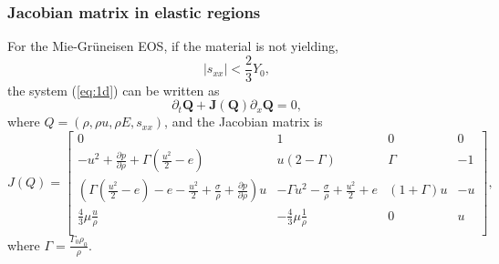 \documentclass[review]{elsarticle}
\begin{document}
\subsubsection{Jacobian matrix in elastic regions} %
For the Mie-Gr\"uneisen EOS, if the material is not yielding, 
\begin{equation}
  |s_{xx}| < \frac{2}{3}Y_0,
\end{equation}
the system (\ref{eq:1d}) can be written as
\begin{equation}
 \partial_t \mathbf{Q} +\mathbf{J}(\mathbf{{Q}})\partial_x\mathbf{Q} = 0,
\end{equation}
where $Q = (\rho, \rho u, \rho E, s_{xx})$, and the Jacobian matrix is 
\begin{equation}\label{eq:Jcb}
  J(Q) = \left[\begin{array}{llll}
      0 & 1 & 0 & 0 \\
      -u^2 + \frac{\partial p}{\partial \rho} +\Gamma(\frac{u^2}{2}-e)& u(2-\Gamma)& \Gamma & -1 \\
	  (\Gamma(\frac{u^2}{2}-e)-e-\frac{u^2}{2}+\frac{\sigma}{\rho}+\frac{\partial p}{\partial \rho})u & -\Gamma u^2 -\frac{\sigma}{\rho}+\frac{u^2}{2} +e & (1+\Gamma)u& -u\\
    \frac{4}{3}\mu\frac{u}{\rho} & -\frac{4}{3}\mu\frac{1}{\rho}& 0 & u \\
\end{array}
\right],
\end{equation}
where $\Gamma = \frac{\Gamma_0\rho_0}{\rho} $.
\end{document}
